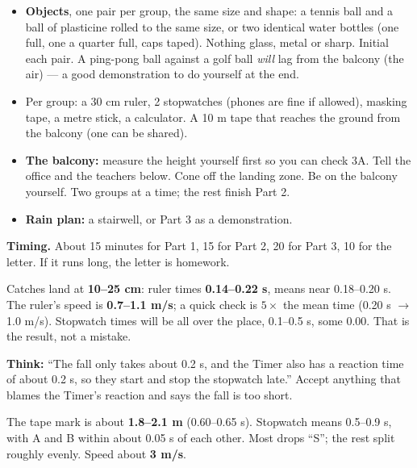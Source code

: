 \documentclass[12pt,a4paper]{article}
\newif\ifkey
\begin{document}
\ifkey
\clearpage
\linespread{1.0}\selectfont
{}


\begin{itemize}
  \item[\tickbox] \textbf{Objects}, one pair per group, the same size and shape:
    a tennis ball and a ball of plasticine rolled to the same size, or two
    identical water bottles (one full, one a quarter full, caps taped). Nothing
    glass, metal or sharp. Initial each pair. A ping-pong ball against a golf ball
    \emph{will} lag from the balcony (the air) --- a good demonstration to do
    yourself at the end.
  \item[\tickbox] Per group: a 30 cm ruler, 2 stopwatches (phones are fine if
    allowed), masking tape, a metre stick, a calculator. A 10 m tape that reaches
    the ground from the balcony (one can be shared).
  \item[\tickbox] \textbf{The balcony:} measure the height yourself first so you
    can check 3A. Tell the office and the teachers below. Cone off the landing
    zone. Be on the balcony yourself. Two groups at a time; the rest finish Part 2.
  \item[\tickbox] \textbf{Rain plan:} a stairwell, or Part 3 as a demonstration.
\end{itemize}

\noindent\textbf{Timing.} About 15 minutes for Part 1, 15 for Part 2, 20 for
Part 3, 10 for the letter. If it runs long, the letter is homework.

\noindent Catches land at \textbf{10--25 cm}: ruler times \textbf{0.14--0.22 s},
means near 0.18--0.20 s. The ruler's speed is \textbf{0.7--1.1 m/s}; a quick check
is $5 \times$ the mean time (0.20 s $\rightarrow$ 1.0 m/s). Stopwatch times will
be all over the place, 0.1--0.5 s, some 0.00. That is the result, not a mistake.

\smallskip
\noindent\textbf{Think:} ``The fall only takes about 0.2 s, and the Timer also
has a reaction time of about 0.2 s, so they start and stop the stopwatch late.''
Accept anything that blames the Timer's reaction and says the fall is too short.

\noindent The tape mark is about \textbf{1.8--2.1 m} (0.60--0.65 s). Stopwatch
means 0.5--0.9 s, with A and B within about 0.05 s of each other. Most drops
``S''; the rest split roughly evenly. Speed about \textbf{3 m/s}.
\end{document}
